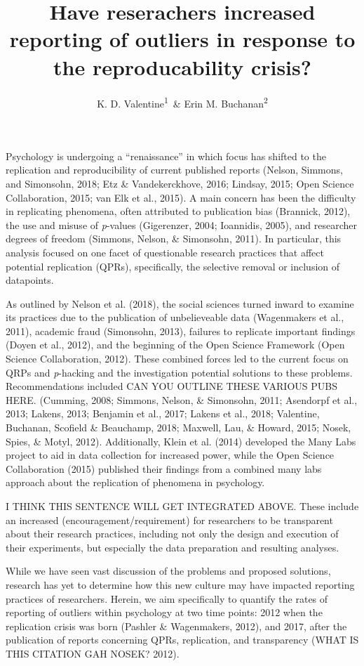 \documentclass[english,man]{apa6}
\title{Have reserachers increased reporting of outliers in response to the
reproducability crisis?}
\author{K. D. Valentine\textsuperscript{1}~\& Erin M. Buchanan\textsuperscript{2}}
\affiliation{
    \vspace{0.5cm}
          \textsuperscript{1} University of Missouri\\
          \textsuperscript{2} Missouri State University  }
\theoremstyle{definition}
\theoremstyle{definition}
\theoremstyle{definition}
\theoremstyle{remark}
\begin{document}
\maketitle

\setcounter{secnumdepth}{0}



Psychology is undergoing a \enquote{renaissance} in which focus has
shifted to the replication and reproducibility of current published
reports (Nelson, Simmons, and Simonsohn, 2018; Etz \& Vandekerckhove,
2016; Lindsay, 2015; Open Science Collaboration, 2015; van Elk et al.,
2015). A main concern has been the difficulty in replicating phenomena,
often attributed to publication bias (Brannick, 2012), the use and
misuse of \emph{p}-values (Gigerenzer, 2004; Ioannidis, 2005), and
researcher degrees of freedom (Simmons, Nelson, \& Simonsohn, 2011). In
particular, this analysis focused on one facet of questionable research
practices that affect potential replication (QPRs), specifically, the
selective removal or inclusion of datapoints.

As outlined by Nelson et al. (2018), the social sciences turned inward
to examine its practices due to the publication of unbelieveable data
(Wagenmakers et al., 2011), academic fraud (Simonsohn, 2013), failures
to replicate important findings (Doyen et al., 2012), and the beginning
of the Open Science Framework (Open Science Collaboration, 2012). These
combined forces led to the current focus on QRPs and \emph{p}-hacking
and the investigation potential solutions to these problems.
Recommendations included CAN YOU OUTLINE THESE VARIOUS PUBS HERE.
(Cumming, 2008; Simmons, Nelson, \& Simonsohn, 2011; Asendorpf et al.,
2013; Lakens, 2013; Benjamin et al., 2017; Lakens et al., 2018;
Valentine, Buchanan, Scofield \& Beauchamp, 2018; Maxwell, Lau, \&
Howard, 2015; Nosek, Spies, \& Motyl, 2012). Additionally, Klein et al.
(2014) developed the Many Labs project to aid in data collection for
increased power, while the Open Science Collaboration (2015) published
their findings from a combined many labs approach about the replication
of phenomena in psychology.

I THINK THIS SENTENCE WILL GET INTEGRATED ABOVE. These include an
increased (encouragement/requirement) for researchers to be transparent
about their research practices, including not only the design and
execution of their experiments, but especially the data preparation and
resulting analyses.

While we have seen vast discussion of the problems and proposed
solutions, research has yet to determine how this new culture may have
impacted reporting practices of researchers. Herein, we aim specifically
to quantify the rates of reporting of outliers within psychology at two
time points: 2012 when the replication crisis was born (Pashler \&
Wagenmakers, 2012), and 2017, after the publication of reports
concerning QPRs, replication, and transparency (WHAT IS THIS CITATION
GAH NOSEK? 2012).
\end{document}
